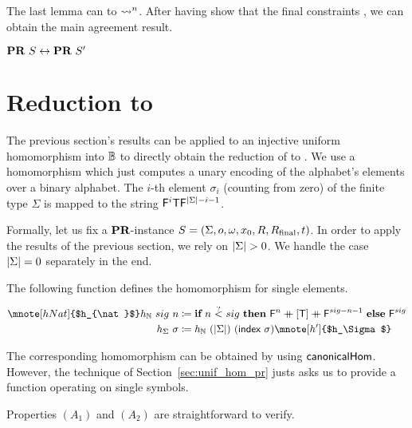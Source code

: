 The last lemma can   to $\rightsquigarrow_{}^n$.
After having show that the final constraints , we can obtain the main agreement result.
\begin{theorem}\label{thm:hom_pr_equiv}
  $\textbf{PR}{}~S \leftrightarrow \textbf{PR}{}~S'$
\end{theorem}

\section{Reduction to \BPR{}}
The previous section's results can be applied to an injective uniform homomorphism into $\mathbb{B}$ to directly obtain the reduction of \PR{} to \BPR{}. 
We use a homomorphism which just computes a unary encoding of the alphabet's elements over a binary alphabet. The $i$-th element $\sigma_i$ (counting from zero) of the finite type $\Sigma$ is mapped to the string $\mathsf{F}^i\mathsf{T} \mathsf{F}^{|\Sigma|-i-1}$.

Formally, let us fix a $\textbf{PR}{}$-instance $S = (\Sigma, o, \omega, x_0, R, R_{\text{final}}, t)$. In order to apply the results of the previous section, we rely on $|\Sigma| > 0$. We handle the case $|\Sigma| = 0$ separately in the end.

The following function defines the homomorphism for single elements. 
\begin{definition}\label{def:hnat_hsig}
  \begin{align*}
    \mnote[hNat]{$h_{\nat}$}
    h_{\nat}~sig~n&\defeq \ITE{n~\oset{?}{<}{+0.9}~sig}{\bfalse^n \concat [\btrue] \concat \bfalse^{sig -n -1}}{\bfalse^{sig}} \\
    h_{\Sigma}~\sigma &\defeq h_{\nat}~(\length{\Sigma})~(\textsf{index}~\sigma)\mnote[h']{$h_\Sigma$}
  \end{align*}
\end{definition}
The corresponding homomorphism can be obtained by using $\textsf{canonicalHom}$. However, the technique of Section~\ref{sec:unif_hom_pr} justs asks us to provide a function operating on single symbols.

Properties $(A_1)$ and $(A_2)$ are straightforward to verify.

